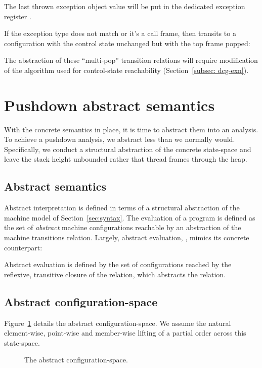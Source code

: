 The last thrown exception object value will be put in 
 the dedicated exception register .
 
If the exception type does not match or it's a call frame, 
then  transits to a configuration 
with the control state unchanged but with the
 top frame popped:
  
The abstraction of these ``multi-pop'' transition relations
will require modification of the 
algorithm used for control-state reachability
(Section~\ref{subsec: dcg-exn}).





\section{Pushdown abstract semantics}
\label{sec:pdexflowoo}

With the concrete semantics in place,
it is time to abstract them into an analysis.
To achieve a pushdown analysis, we abstract less than we normally would. 
Specifically, we
conduct a structural abstraction of the concrete state-space
and leave the stack height unbounded
rather that thread frames through the heap.

\subsection{Abstract semantics}

Abstract interpretation is defined in terms of a structural
abstraction of the machine model of Section~\ref{sec:syntax}.  The
evaluation of a program is defined as the set of \emph{abstract}
machine configurations reachable by an abstraction of the machine
transitions relation. Largely, abstract evaluation, , mimics its concrete counterpart:

Abstract evaluation is defined by the set of configurations reached by
the reflexive, transitive closure of the  relation, which
abstracts the  relation.


\subsection{Abstract configuration-space}

Figure~\ref{fig:abs-conf-space} details the abstract configuration-space. 
We assume the natural element-wise, point-wise and member-wise
lifting of a partial order across this state-space.



 \begin{figure}

\caption{The abstract configuration-space.}
\label{fig:abs-conf-space}
 \end{figure}
 
